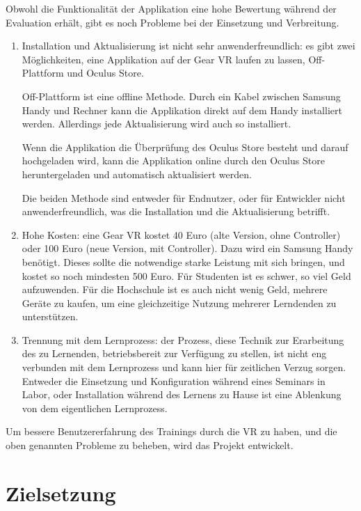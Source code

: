 Obwohl die Funktionalität der Applikation eine hohe Bewertung während der Evaluation erhält, gibt es noch Probleme bei der Einsetzung und Verbreitung.
\begin{enumerate}

\item Installation und Aktualisierung ist nicht sehr anwenderfreundlich: es gibt zwei Möglichkeiten, eine Applikation auf der Gear VR laufen zu lassen, Off-Plattform und Oculus Store.

Off-Plattform ist eine offline Methode. Durch ein Kabel zwischen Samsung Handy und Rechner kann die Applikation direkt auf dem Handy installiert werden. Allerdings jede Aktualisierung wird auch so installiert.

Wenn die Applikation die Überprüfung des Oculus Store besteht und darauf hochgeladen wird, kann die Applikation online durch den Oculus Store heruntergeladen und automatisch aktualisiert werden.

Die beiden Methode sind entweder für Endnutzer, oder für Entwickler nicht anwenderfreundlich, was die Installation und die Aktualisierung betrifft.

\item Hohe Kosten: eine Gear VR kostet 40 Euro (alte Version, ohne Controller) oder 100 Euro (neue Version, mit Controller). Dazu wird ein Samsung Handy benötigt. Dieses sollte die notwendige starke Leistung mit sich bringen, und kostet so noch mindesten 500 Euro. Für Studenten ist es schwer, so viel Geld aufzuwenden. Für die Hochschule ist es auch nicht wenig Geld, mehrere Geräte zu kaufen, um eine gleichzeitige Nutzung mehrerer Lerndenden zu unterstützen.

\item Trennung mit dem Lernprozess: der Prozess, diese Technik zur Erarbeitung des zu Lernenden, betriebsbereit zur Verfügung zu stellen, ist nicht eng verbunden mit dem Lernprozess und kann hier für zeitlichen Verzug sorgen. Entweder die Einsetzung und Konfiguration während eines Seminars in Labor, oder Installation während des Lernens zu Hause ist eine Ablenkung von dem eigentlichen Lernprozess.

\end{enumerate}

Um bessere Benutzererfahrung des Trainings durch die VR zu haben, und die oben genannten Probleme zu beheben, wird das Projekt entwickelt.

\section{Zielsetzung}

